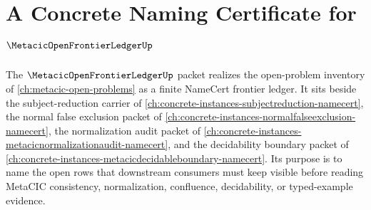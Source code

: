 \chapter{A Concrete Naming Certificate for $\MetacicOpenFrontierLedgerUp$}
\label{ch:concrete-instances-metacic-open-frontier-ledger-namecert}

The $\MetacicOpenFrontierLedgerUp$ packet realizes the open-problem inventory of \autoref{ch:metacic-open-problems} as a finite NameCert frontier ledger. It sits beside the subject-reduction carrier of \autoref{ch:concrete-instances-subjectreduction-namecert}, the normal false exclusion packet of \autoref{ch:concrete-instances-normalfalseexclusion-namecert}, the normalization audit packet of \autoref{ch:concrete-instances-metacicnormalizationaudit-namecert}, and the decidability boundary packet of \autoref{ch:concrete-instances-metacicdecidableboundary-namecert}. Its purpose is to name the open rows that downstream consumers must keep visible before reading MetaCIC consistency, normalization, confluence, decidability, or typed-example evidence.

